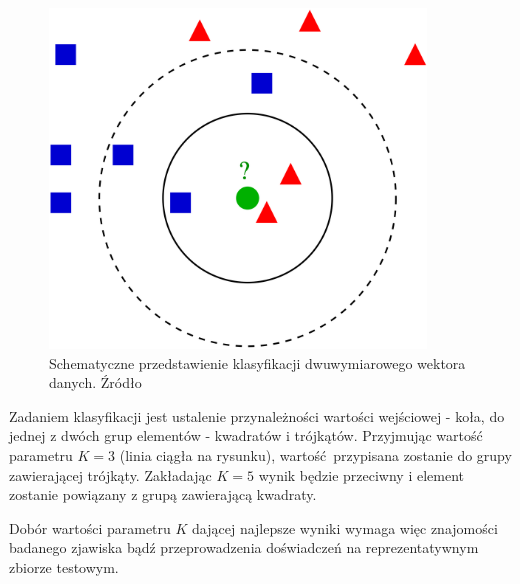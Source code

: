 \begin{figure}[H]
	\centering
	\includegraphics[width=10cm]{img/KnnClassification}
	\caption{Schematyczne przedstawienie klasyfikacji dwuwymiarowego wektora danych. Źródło \cite{knn-wiki}}
	\label{fig:knn-idea}
\end{figure}

Zadaniem klasyfikacji jest ustalenie przynależności wartości wejściowej - koła, do jednej z dwóch grup elementów - kwadratów i trójkątów. Przyjmując wartość parametru $K=3$ (linia ciągła na rysunku), wartość przypisana zostanie do grupy zawierającej trójkąty. Zakładając $K=5$ wynik będzie przeciwny i element zostanie powiązany z grupą zawierającą kwadraty.

Dobór wartości parametru $K$ dającej najlepsze wyniki wymaga więc znajomości badanego zjawiska bądź przeprowadzenia doświadczeń na reprezentatywnym zbiorze testowym.
